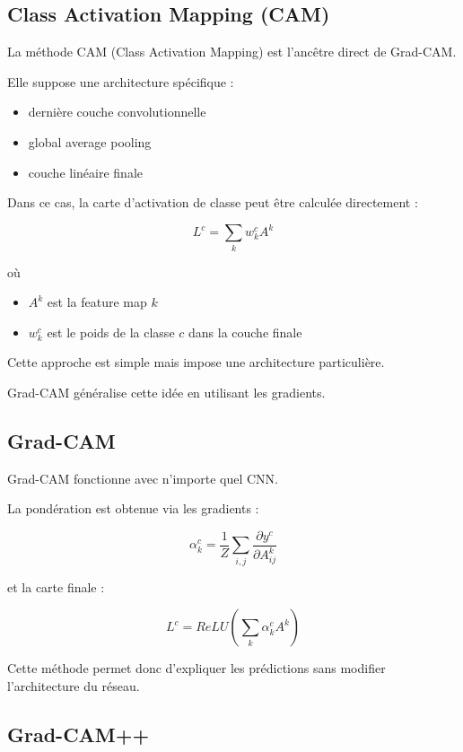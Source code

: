 ﻿\documentclass[11pt,a4paper]{article}
\begin{document}
\subsection{Class Activation Mapping (CAM)}

La méthode CAM (Class Activation Mapping) est l'ancêtre direct de Grad-CAM.

Elle suppose une architecture spécifique :

\begin{itemize}
\item dernière couche convolutionnelle
\item global average pooling
\item couche linéaire finale
\end{itemize}

Dans ce cas, la carte d'activation de classe peut être calculée directement :

\[
L^c = \sum_k w_k^c A^k
\]

où

\begin{itemize}
\item $A^k$ est la feature map $k$
\item $w_k^c$ est le poids de la classe $c$ dans la couche finale
\end{itemize}

Cette approche est simple mais impose une architecture particulière.

Grad-CAM généralise cette idée en utilisant les gradients.

\subsection{Grad-CAM}

Grad-CAM fonctionne avec n'importe quel CNN.

La pondération est obtenue via les gradients :

\[
\alpha_k^c =
\frac{1}{Z}
\sum_{i,j}
\frac{\partial y^c}{\partial A_{ij}^k}
\]

et la carte finale :

\[
L^c =
ReLU
\left(
\sum_k
\alpha_k^c A^k
\right)
\]

Cette méthode permet donc d'expliquer les prédictions sans modifier l'architecture du réseau.

\subsection{Grad-CAM++}
\end{document}
